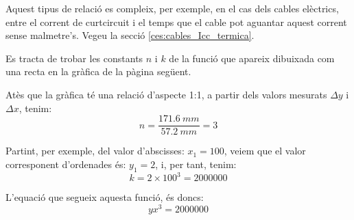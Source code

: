 Aquest tipus de relació es compleix, per exemple, en el cas dels cables elèctrics, entre el corrent de curtcircuit i el temps que el cable pot aguantar aquest corrent sense malmetre's. Vegeu la secció \vref{ces:cables_Icc_termica}.

	
\begin{exemple}[\ConstantsEscalaLogLog{}]
	\addcontentsxms{\ConstantsEscalaLogLog}
    Es tracta de trobar les constants $n$ i $k$ de la funció que apareix dibuixada com una recta en la gràfica de la pàgina següent.

     Atès que la gràfica té una relació d'aspecte 1:1, a partir dels valors mesurats $\Delta{}y$ i $\Delta{}x$, tenim:
    \[
        n = \frac{\qty{171,6}{mm}}{\qty{57,2}{mm}} = 3
    \]

    Partint, per exemple, del valor d'abscisses: $x_1=100$, veiem que el valor corresponent d'ordenades és: $y_1=2$, i, per tant, tenim:
    \[
        k = 2 \times 100^3  = \num{2000000}
    \]

    L'equació que segueix aquesta funció, és doncs:
    \[
        y x^3 = \num{2000000}
    \]

   \begin{center}
        
   \end{center}

\end{exemple}

